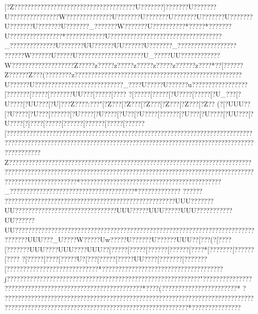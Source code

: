 {{{{{{{{{{{{{{{{{{{{{{{{{{{{{{{{{{{{{{{{{{{{{{{{{{{{{{{{{{{{{{{{{{{{{{{{{{{{{{{{{{{{{{{{{{{{{{{{{{{{{{{{{{{{{{{{{{{{{{{{{{{{{{{{{{{{{{{{{{{{{{{{{{{{{{{{{{{{{{{{{{{{{{{{{{{{{{{{{{{{{{{{{{{{{{{{{{{{{{{{{{{{{{{{{{{{{{{{{{{{{{{{{{{{{{{{{{{{{{{{{{{{{{{{{{{{{{{{{{{{{{{{{{{{{{{{{{{{{{{{{{{{{{{{{{{{{{{{{{{{{{{{{{{{{{{{{{{{{{{{{{{{{{{{{{{{{{{{{{{{{{{{{{{{{{{{{{{{{{{{{{{{{{{{{{{{{{{{{{{{{{{{{{{{{{{{{{{{{{{{{{{{{{{{{{{{{{{{{{{{{{{{{{{{{{{{{{{{{{{{{{{{{{{{{{{{{{{{{{{{{{{{{{{{{{{{{{{{{{{{{{{{{{{{{{{{{{{{{{{{{{{{{{{{{{{{{{{{{{{{{{{{{{{{{{{{{{{{{{{{{{{{{{{{{{{{{{{{{{{{{{{{{{{{{{{{{{{{{{{{{{{{{{{{{{{{{{{{{{{{{{{{{{{{{{{{{{{{{{{{{{{{{{{{{{{{{{{{{{{{{{{{{{{{{{{{{{{{{{{{{{{{{{{{{{{{{{{{{{{{{{{{{{{{{{{{{{{{{{{{{{{{{{{{{{{{{{{{{{{{{{{{{{{{{{{{{{{{{{{{{{{{{{{{{{{{{{{{{{{{{{{{{{{{{{{{{{{{{{{{{{{{{{{{{{{{{{{{{{{{{{{{{{{{{{{{{{{{{{{{{{{{{{{{{{{{{{{{{{{{{{{{{{{{{{{{{{{{{{{{{{{{{{{{{{{{{{{{{{{{{{{{{{{{{{{{{{{{{{{{{{{{{{{{{{{{{{{{{{{{{{{{{{{{{{{{{{{{{{{{{{{{{{{{{{{{{{{{{{{{{{{{{{{{{{{{{{{{{{{{{{{{{{{{{{{{{{{ [?Z???  ??????????????????????????????????U???????]???????U???????U???????????????W??????????????U???????U???????U???????U???????U???????U???????U???????U???????_???????W???????U??????????*?????*???????U????? ??{???? ??{???* ??{???? {??????U??{???????{?????????????????????????_???????}???????U???????UU??????UU??????U???????_?????{???????{?????{??????{?W?????{?U}????{?U?????{???????{???????{?U_????{?UU????{???????{?W?????{???????{???????Z????{?z???? {?z???? {?z???? {?z???? {?z?????{?z????*??[???? ??Z???? ??Z???( ??{???? ??z???? ??{???? ??{???? ??{??? ??{???? ??{???? ??{???? ??{???? {??????U{??????U??{?????{?????{???????{???????{?_???{?U???{?{?U?????{?u???{?{?????{?{???????[???????[?????[?????{?{?UU??{?[???? {?[???? {?[???? {?[????{?[?U???{?[????{?[?U_??{?[?U???{?[?UU??{?[?U]??{?Z???{?:???" [?Z??? [?Z???  [?Z??? [?Z???  [?Z??? [?Z?? ( {?[?UUU?{?[?U???{?[?U??{?[?????{?[?U???{?[?U???{?[?U?{?[?U???{?[?????{?[?U??{?[?U???{?[?UU}???[?U???{?[?]???{?[?}???{?[?????{?[?????{?[????{?[?????{?[??????????????????????????????????????????????????????????????????????????????????????????????????????????????????????????????????????????????????????????????????Z????????????????????????????????????????????????????????????????????????????????????????????????????????????????????????????????????????????????????????????????????????????*???????????????????????????????????????????_?????????????{???????????????{???????{???*???{???????{???
??{????
??{???? ??{???? ??{??????{???? ??{??? ??{???  ??{???  ??{??   ??{???  ????UUU???????UU??{??   ????    ????    ???????????????????UUU?????UUU?????UUU???????  ????UU??????UU????????????{???????{?????{?????????????????{???????{?????{?{?????{?{?????{?{?????{?{???????{?UUU?{?{?_U??{?{?W???{?{?Uw????{?U?????{?U?????{?UUU?{?[???( {?[??? {?[???? ??{?UUU???{?UUU???{?UUU?{?[???? {?[???? {?[?????{?[?????{?[????*[?{?????{?[?????{?[????
{?[???? {?[???? [?{????U{?[?? {?[???? {?[??? {?{?UU????[???????[???????[?????{?{?????{?{?????{?{?????{?{????*{?{???? {?{???? {?{??? ???????????????????????j???????????????????????????????????????????????????????????"??????????????????????????????????????????? ? ????? ????????*????(???????????????????????*
?
????????????????????????????????????????????????????????????????????????????????????????????????????????????????????????????????????*???????????????}}}}}}}}}}}}}}}}}}}}}}}}}}}}}}}}}}}}}}}}}}}}}}}}}}}}}}}}}}}}}}}}}}}}}}}}}}}}}}}}}}}}}}}}}}}}}}}}}}}}}}}}}}}}}}}}}}}}}}}}}}}}}}}}}}}}}}}}}}}}}}}}}}}}}}}}}}}}}}}}}}}}}}}}}}}}}}}}}}}}}}}}}}}}}}}}}}}}}}}}}}}}}}}}}}}}}}}}}}}}}}}}}}}}}}}}}}}}}}}}}}}}}}}}}}}}}}}}}}}}}}}}}}}}}}}}}}}}}}}}}}}}}}}}}}}}}}}}}}}}}}}}}}}}}}}}}}}}}}}}}}}}}}}}}}}}}}}}}}}}}}}}}}}}}}}}}}}}}}}}}}}}}}}}}}}}}}}}}}}}}}}}}}}}}}}}}}}}}}}}}}}}}}}}}}}}}}}}}}}}}}}}}}}}}}}}}}}}}}}}}}}}}}}}}}}}}}}}}}}}}}}}}}}}}}}}}}}}}}}}}}}}}}}}}}}}}}}}}}}}}}}}}}}}}}}}}}}}}}}}}}}}}}}}}}}}}}}}}}}}}}}}}}}}}}}}}}}}}}}}}}}}}}}}}}}}}}}}}}}}}}}}}}}}}}}}}}}}}}}}}}}}}}}}}}}}}}}}}}}}}}}}}}}}}}}}}}}}}}}}}}}}}}}}}}}}}}}}}}}}}}}}}}}}}}}}}}}}}}}}}}}}}}}}}}}}}}}}}}}}}}}}}}}}}}}}}}}}}}}}}}}}}}}}}}}}}}}}}}}}}}}}}}}}}}}}}}}}}}}}}}}}}}}}}}}}}}}}}}}}}}}}}}}}}}}}}}}}}}}}}}}}}}}}}}}}}}}}}}}}}}}}}}}}}}}}}}}}}}}}}}}}}}}}}}}}}}}}}}}}}}}}}}}}}}}}}}}}}}}}}}}}}}}}}}}}}}}}}}}}}}}}}}}}}}}}}}}}}}}}}}}}}}}}}}}}}}}}}}}}}}}}}}}}}}}}}}}}}}}}}}}}}}}}}}}}}}}}}}}}}}}}}}}}}}}}}}}}}}}}}}}}}}}}}}}}}}}}}}}}}}}}}}}}}}}}}}}}}}}}}}}}}}}}}}}}}}}}}}}}}}}}}}}}}}}}}}}}}}}}}}}}}}}}}}}}}}}}}}}}}}}}}}}}}}}}}}}}}}}}}}}}}}}}}}}}}}}}}}}}}}}}}}}}
